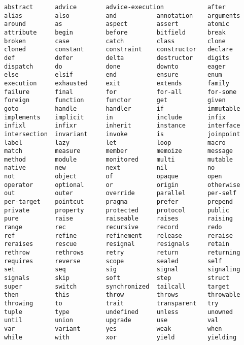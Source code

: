 \syntax\begin{lstlisting}
abstract      advice        advice-execution            after
alias         also          and           annotation    arguments
around        as            aspect        assert        atomic
attribute     begin         before        bitfield      break
broken        case          catch         class         clone
cloned        constant      constraint    constructor   declare
def           defer         delta         destructor    digits
dispatch      do            done          downto        eager
else          elsif         end           ensure        enum
execution     exhausted     exit          extends       family
failure       final         for           for-all       for-some
foreign       function      functor       get           given
goto          handle        handler       if            immutable
implements    implicit      in            include       infix
infixl        infixr        inherit       instance      interface
intersection  invariant     invoke        is            joinpoint
label         lazy          let           loop          macro
match         measure       member        memoize       message
method        module        monitored     multi         mutable
native        new           next          nil           no
not           object        of            opaque        open
operator      optional      or            origin        otherwise
out           outer         override      parallel      per-self
per-target    pointcut      pragma        prefer        prepend
private       property      protected     protocol      public
pure          raise         raiseable     raises        raising
range         rec           recursive     record        redo
ref           refine        refinement    release       reraise
reraises      rescue        resignal      resignals     retain
rethrow       rethrows      retry         return        returning
requires      reverse       scope         sealed        self
set           seq           sig           signal        signaling
signals       skip          soft          step          struct
super         switch        synchronized  tailcall      target
then          this          throw         throws        throwable
throwing      to            trait         transparent   try
tuple         type          undefined     unless        unowned
until         union         upgrade       use           val
var           variant       yes           weak          when
while         with          xor           yield         yielding
\end{lstlisting}

